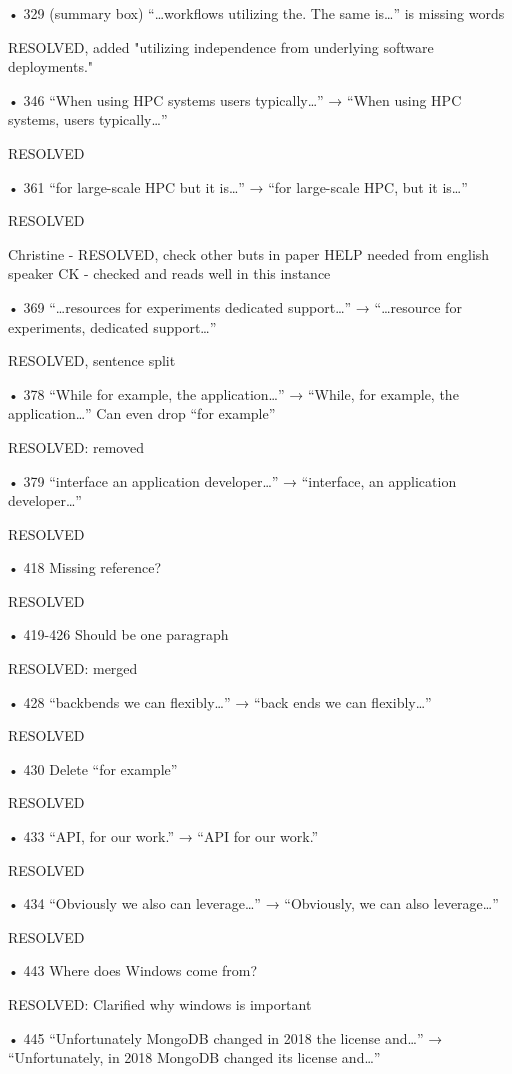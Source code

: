 • 329 (summary box) “…workflows utilizing the. The same is…” is missing words

    RESOLVED, added "utilizing independence from underlying software deployments."

• 346 “When using HPC systems users typically…” → “When using HPC systems, users
typically…”

    RESOLVED
    
• 361 “for large-scale HPC but it is…” → “for large-scale HPC, but it is…”

    RESOLVED

    Christine - RESOLVED, check other buts in paper
    HELP needed from english speaker
    CK - checked and reads well in this instance

• 369 “…resources for experiments dedicated support…” → “…resource for experiments,
dedicated support…”

    RESOLVED, sentence split
    
• 378 “While for example, the application…” → “While, for example, the application…”
Can even drop “for example”

    RESOLVED: removed
    
• 379 “interface an application developer…” → “interface, an application developer…”

    RESOLVED

• 418 Missing reference?

    RESOLVED
    
• 419-426 Should be one paragraph

    RESOLVED: merged
    
• 428 “backbends we can flexibly…” → “back ends we can flexibly…”

    RESOLVED

• 430 Delete “for example”

    RESOLVED
    
• 433 “API, for our work.” → “API for our work.”

    RESOLVED
    
• 434 “Obviously we also can leverage…” → “Obviously, we can also leverage…”

    RESOLVED
    
• 443 Where does Windows come from?

    RESOLVED: Clarified why windows is important
    
• 445 “Unfortunately MongoDB changed in 2018 the license and…” → “Unfortunately, in
2018 MongoDB changed its license and…”

